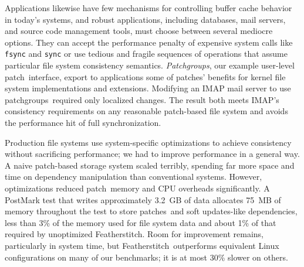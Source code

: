 \documentclass[9pt,twocolumn,letterpaper]{article}
\newcommand{\Kudos}{Featherstitch}
\newcommand{\Featherstitch}{\Kudos}
\newcommand{\patch}{patch}
\newcommand{\patches}{patches}
\newcommand{\Patch}{Patch}
\newcommand{\module}{module}
\newcommand{\modules}{modules}
\newcommand{\patchgroups}{patchgroups}
\newcommand{\Patchgroups}{Patchgroups}
\begin{document}
Applications likewise have few mechanisms
 for controlling buffer cache behavior in today's systems, and
%
robust applications, including databases, mail servers, and source code
 management tools, must choose between several mediocre options.
%
They can accept the performance penalty of expensive system calls like
 \texttt{fsync} and \texttt{sync} or use tedious and fragile sequences
 of operations that assume particular file system consistency semantics.
%
\emph{\Patchgroups}, our example user-level \patch\ interface,
 export to applications some of \patches' benefits
 for kernel file system implementations and extensions.
%
Modifying an IMAP mail server to use \patchgroups\ required only localized
 changes.  The result both meets IMAP's consistency requirements on any reasonable
 patch-based file system and avoids the performance hit of full
 synchronization.


\begin{comment}
Our file system modules impose soft updates-style \patch\ requirements by
 default, since doing so requires some knowledge of the file system's
 structures; we have also written a journal module that can change
 existing dependencies to express either full or metadata-only journaling.
%
A file system module not interested in supporting soft updates support
 could instead impose no \patch\ requirements, and count on the journal
 module to provide a consistency guarantee.


The \Kudos\ storage system implementation is decomposed entirely into
 pluggable \modules\ that manipulate \patches, hopefully making the system
 as a whole more configurable, extensible, and easier to understand.
%
Any storage system \module\ can generate \patches; other modules can examine
 them and modify them when required.
%
\Patch\ dependencies are obeyed by all other storage system layers, allowing
 them to be passed through layers such as loopback block devices.
%
As a result, the loosely-coupled \modules\ that implement a file system
 can cooperate to enforce strong and often complex consistency guarantees,
 even though each \module\ only does a small part of the work.
\end{comment}


Production file systems use system-specific optimizations to achieve
 consistency without sacrificing performance; we had to improve
 performance in a general way.
%
A naive \patch-based storage system scaled terribly,
 spending far more space and time on dependency manipulation than
 conventional systems.
%
However, optimizations reduced \patch\ memory and
 CPU overheads significantly.
%
A PostMark test that writes approximately 3.2~GB of data
 allocates 75~MB of memory throughout the test to store \patches\ and
 soft updates-like dependencies, less than 3\% of the memory used for file
 system data and about 1\% of that required by unoptimized
 \Featherstitch.
%
Room for improvement remains, particularly in system time, but
 \Featherstitch\ outperforms equivalent Linux configurations on
 many of our benchmarks; it is at most 30\% slower on others.
\end{document}
